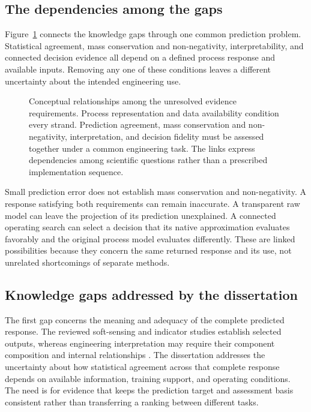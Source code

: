 \subsection{The dependencies among the gaps}

Figure~\ref{fig:rrl_intersecting_gaps} connects the knowledge gaps through one common prediction problem. Statistical agreement, mass conservation and non-negativity, interpretability, and connected decision evidence all depend on a defined process response and available inputs. Removing any one of these conditions leaves a different uncertainty about the intended engineering use.

\begin{figure}[htbp]
\centering
\begingroup\linespread{1}\selectfont

\endgroup
\caption{Conceptual relationships among the unresolved evidence requirements. Process representation and data availability condition every strand. Prediction agreement, mass conservation and non-negativity, interpretation, and decision fidelity must be assessed together under a common engineering task. The links express dependencies among scientific questions rather than a prescribed implementation sequence.}
\label{fig:rrl_intersecting_gaps}
\end{figure}

Small prediction error does not establish mass conservation and non-negativity. A response satisfying both requirements can remain inaccurate. A transparent raw model can leave the projection of its prediction unexplained. A connected operating search can select a decision that its native approximation evaluates favorably and the original process model evaluates differently. These are linked possibilities because they concern the same returned response and its use, not unrelated shortcomings of separate methods.

\subsection{Knowledge gaps addressed by the dissertation}

The first gap concerns the meaning and adequacy of the complete predicted response. The reviewed soft-sensing and indicator studies establish selected outputs, whereas engineering interpretation may require their component composition and internal relationships \citep{Ching2022,Ekinci2023,Wang2025}. The dissertation addresses the uncertainty about how statistical agreement across that complete response depends on available information, training support, and operating conditions. The need is for evidence that keeps the prediction target and assessment basis consistent rather than transferring a ranking between different tasks.

